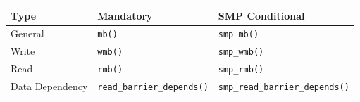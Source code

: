\centering
\small
\renewcommand{\arraystretch}{1.5}
\begin{tabular}{|p{3cm}|p{5cm}|p{5.5cm}|}
        \hline \textbf{Type}& \textbf{Mandatory}& \textbf{SMP Conditional} \\[5pt]
        \hline General & \texttt{mb()} & \texttt{smp\_mb()} \\
        \hline Write & \texttt{wmb()}  & \texttt{smp\_wmb()}  \\
        \hline Read & \texttt{rmb()} & \texttt{smp\_rmb()} \\
	\hline Data Dependency & \texttt{read\_barrier\_depends()} & \texttt{smp\_read\_barrier\_depends()} \\
	\hline
\end{tabular}
